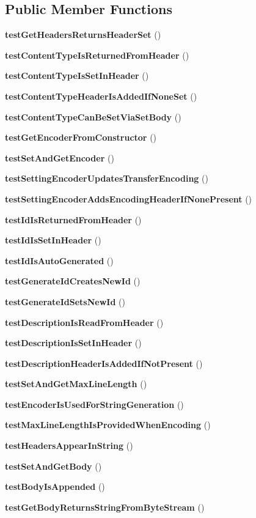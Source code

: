 \subsection*{Public Member Functions}
\begin{DoxyCompactItemize}
\item 
{\bf test\+Get\+Headers\+Returns\+Header\+Set} ()
\item 
{\bf test\+Content\+Type\+Is\+Returned\+From\+Header} ()
\item 
{\bf test\+Content\+Type\+Is\+Set\+In\+Header} ()
\item 
{\bf test\+Content\+Type\+Header\+Is\+Added\+If\+None\+Set} ()
\item 
{\bf test\+Content\+Type\+Can\+Be\+Set\+Via\+Set\+Body} ()
\item 
{\bf test\+Get\+Encoder\+From\+Constructor} ()
\item 
{\bf test\+Set\+And\+Get\+Encoder} ()
\item 
{\bf test\+Setting\+Encoder\+Updates\+Transfer\+Encoding} ()
\item 
{\bf test\+Setting\+Encoder\+Adds\+Encoding\+Header\+If\+None\+Present} ()
\item 
{\bf test\+Id\+Is\+Returned\+From\+Header} ()
\item 
{\bf test\+Id\+Is\+Set\+In\+Header} ()
\item 
{\bf test\+Id\+Is\+Auto\+Generated} ()
\item 
{\bf test\+Generate\+Id\+Creates\+New\+Id} ()
\item 
{\bf test\+Generate\+Id\+Sets\+New\+Id} ()
\item 
{\bf test\+Description\+Is\+Read\+From\+Header} ()
\item 
{\bf test\+Description\+Is\+Set\+In\+Header} ()
\item 
{\bf test\+Description\+Header\+Is\+Added\+If\+Not\+Present} ()
\item 
{\bf test\+Set\+And\+Get\+Max\+Line\+Length} ()
\item 
{\bf test\+Encoder\+Is\+Used\+For\+String\+Generation} ()
\item 
{\bf test\+Max\+Line\+Length\+Is\+Provided\+When\+Encoding} ()
\item 
{\bf test\+Headers\+Appear\+In\+String} ()
\item 
{\bf test\+Set\+And\+Get\+Body} ()
\item 
{\bf test\+Body\+Is\+Appended} ()
\item 
{\bf test\+Get\+Body\+Returns\+String\+From\+Byte\+Stream} ()

\end{DoxyCompactItemize}
